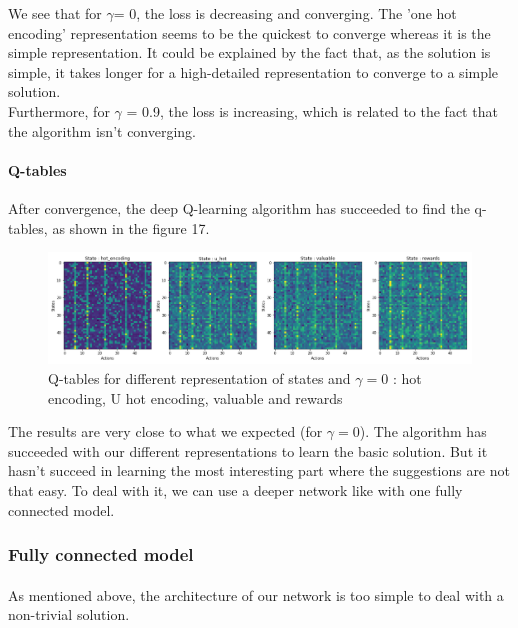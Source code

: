 \documentclass[a4paper]{article}
\begin{document}
        
        
        We see that for $\gamma $= 0, the loss is decreasing and converging. The 'one hot encoding' representation seems to be the quickest to converge whereas it is the simple representation. It could be explained by the fact that, as the solution is simple, it takes longer for a high-detailed representation to converge to a simple solution. \\
        Furthermore, for $\gamma$ = 0.9, the loss is increasing, which is related to the fact that the algorithm isn't converging. 
        
        \paragraph{Q-tables}
        After convergence, the deep Q-learning algorithm has succeeded to find the q-tables, as shown in the figure 17. 
        \begin{figure}[h!]
            \centering
            \includegraphics[scale = 0.3]{img/q_table_linear_0.png}
            \caption{Q-tables for different representation of states and $\gamma = 0$ : hot encoding, U hot encoding, valuable and rewards}
            \label{fig:my_label}
        \end{figure}
        \newline The results are very close to what we expected (for $\gamma = 0$). The algorithm has succeeded with our different representations to learn the basic solution. But it hasn't succeed in learning the most interesting part where the suggestions are not that easy. To deal with it, we can use a deeper network like with one fully connected model.
        
    \subsubsection{Fully connected model}
    \paragraph{} As mentioned above, the architecture of our network is too simple to deal with a non-trivial solution. 
\end{document}

